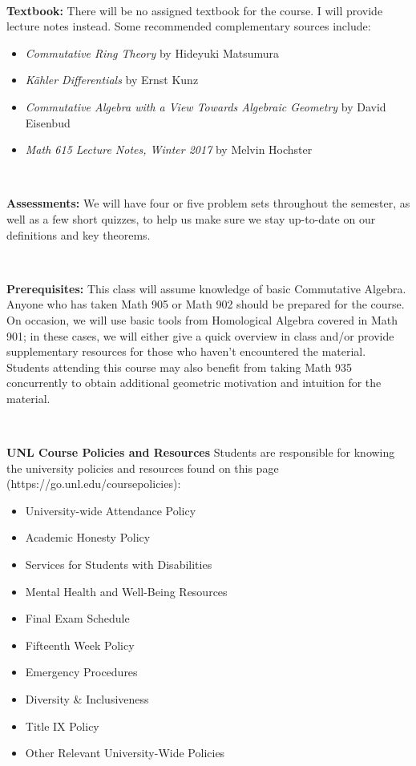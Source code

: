 \documentclass{amsart}
\begin{document}
\

\noindent
\textbf{Textbook:} There will be no assigned textbook for the course. I will provide lecture notes instead. Some recommended complementary sources include:
\begin{itemize}
\item \emph{Commutative Ring Theory} by Hideyuki Matsumura
\item \emph{K\"ahler Differentials} by Ernst Kunz
\item \emph{Commutative Algebra with a View Towards Algebraic Geometry} by David Eisenbud 
 \item \emph{Math 615 Lecture Notes, Winter 2017} by Melvin Hochster
\end{itemize}
\

\noindent
{\bf Assessments:} We will have four or five problem sets throughout the semester, as well as a few short quizzes, to help us make sure we stay up-to-date on our definitions and key theorems.

\

\noindent
{\bf Prerequisites:} This class will assume knowledge of basic Commutative Algebra. Anyone who has taken Math 905 or Math 902 should be prepared for the course. On occasion, we will use basic tools from Homological Algebra covered in Math 901; in these cases, we will either give a quick overview in class and/or provide supplementary resources for those who haven’t encountered the material. Students attending this course may also benefit from taking Math 935 concurrently to obtain additional geometric motivation and intuition for the material.


\



\noindent
\textbf{UNL Course Policies and Resources}
Students are responsible for knowing the university policies and resources found on this page (https://go.unl.edu/coursepolicies):
 
 \begin{itemize}
\item University-wide Attendance Policy
\item Academic Honesty Policy
\item Services for Students with Disabilities
\item Mental Health and Well-Being Resources
\item Final Exam Schedule 
\item Fifteenth Week Policy 
\item Emergency Procedures 
\item Diversity \& Inclusiveness 
\item Title IX Policy 
\item Other Relevant University-Wide Policies
\end{itemize} 


\vfill
\pagebreak
\smallskip
%
\end{document}
